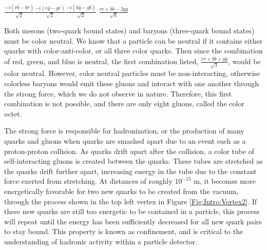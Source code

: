 {\centering  

    $\frac{-i(r\overline{b} - b\overline{r})}{\sqrt{2}}$\hspace{1cm}$\frac{-i(r\overline{g} - g\overline{r})}{\sqrt{2}}$\hspace{1cm}$\frac{-i(b\overline{g} - g\overline{b})}{\sqrt{2}}$ \hspace{1cm}$\frac{r\overline{r} + b\overline{b} -2g\overline{g}}{\sqrt{6}}$
    
    }

Both mesons (two-quark bound states) and baryons (three-quark bound states) must be color neutral. We know that a particle can be neutral if it contains either quarks with color-anti-color, or all three color quarks. Then since the combination of red, green, and blue is neutral, the first combination listed, $\frac{r\overline{r} + b\overline{b} + g\overline{g}}{\sqrt{3}}$, would be color neutral. However, color neutral particles must be non-interacting, otherwise colorless baryons would emit these gluons and interact with one another through the strong force, which we do not observe in nature. Therefore, this first combination is not possible, and there are only eight gluons, called the color octet.

The strong force is responsible for hadronization, or the production of many quarks and gluons when quarks are smashed apart due to an event such as a proton-proton collision. As quarks drift apart after the collision, a color tube of self-interacting gluons is created between the quarks. These tubes are stretched as the quarks drift further apart, increasing energy in the tube due to the constant force exerted from stretching. At distances of roughly $10^{-15}$ m, it becomes more energetically favorable for two new quarks to be created from the vacuum, through the process shown in the top left vertex in Figure \ref{Fig:Intro:Vertex2}. If these new quarks are still too energetic to be contained in a particle, this process will repeat until the energy has been sufficiently decreased for all new quark pairs to stay bound. This property is known as confinement, and is critical to the understanding of hadronic activity within a particle detector.

